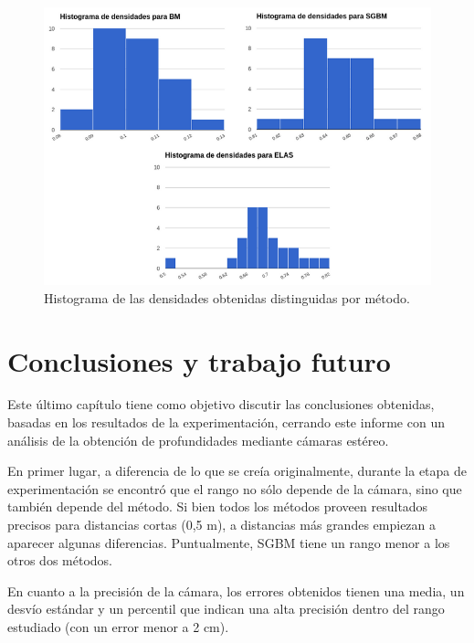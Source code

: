 \documentclass[11pt,a4paper,titlepage]{article}
\begin{document}
\begin{figure}[h!]

  \centering
    \includegraphics[width=1\textwidth]{f16.png}
  \caption{Histograma de las densidades obtenidas distinguidas por método.}
\end{figure}

\newpage

\section{Conclusiones y trabajo futuro}

Este último capítulo tiene como objetivo discutir las conclusiones obtenidas, basadas en los resultados de la experimentación, cerrando este informe con un análisis de la obtención de profundidades mediante cámaras estéreo.

En primer lugar, a diferencia de lo que se creía originalmente, durante la etapa de experimentación se encontró que el rango no sólo depende de la cámara, sino que también depende del método. Si bien todos los métodos proveen resultados precisos para distancias cortas (0,5 m), a distancias más grandes empiezan a aparecer algunas diferencias. Puntualmente, SGBM tiene un rango menor a los otros dos métodos.

En cuanto a la precisión de la cámara, los errores obtenidos tienen una media, un desvío estándar y un percentil que indican una alta precisión dentro del rango estudiado (con un error menor a 2 cm).
\end{document}
